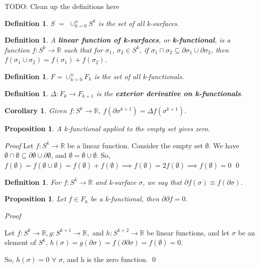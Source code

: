 \documentclass{book}
\newtheorem{defn}[equation]{Definition}
\newtheorem{coro}[equation]{Corollary}
\newtheorem{prop}[equation]{Proposition}
\renewenvironment{proof}{\emph{Proof}}{\qed}
\begin{document}
TODO: Clean up the definitions here

\begin{defn}
	S $=$ $\cup^n_{k=0}S^k$ is the set of all k-surfaces. 
\end{defn}

\begin{defn}
	A \textbf{linear function of k-surfaces}, or \textbf{k-functional}, is a function $f : S^k \to \mathbb{R}$ such that for $\sigma_1$, $\sigma_2 \in S^k$, if $\sigma_1 \cap \sigma_2 \subseteq \partial\sigma_1 \cup \partial\sigma_2$, then $f(\sigma_1\cup\sigma_2) = f(\sigma_1) + f(\sigma_2)$. 
\end{defn}

\begin{defn}
	$F = \cup_{k=0}^nF_k$ is the set of all k-functionals. 
\end{defn}

\begin{defn}
	$\Delta : F_k \to F_{k+1}$ is the \textbf{exterior derivative on k-functionals}. 
\end{defn}

\begin{coro}
	Given $f : S^k \to \mathbb{R}$, $f(\partial\sigma^{k+1}) = \Delta f(\sigma^{k+1})$. 
\end{coro}

\begin{prop}
	A k-functional applied to the empty set gives zero. 
\end{prop}
\begin{proof}
	Let $f : S^k \to \mathbb{R}$ be a linear function. Consider the empty set $\emptyset$. 
We have $\emptyset \cap \emptyset \subseteq \partial\emptyset \cup \partial\emptyset$, and $\emptyset = \emptyset\cup\emptyset$. 
So, $f(\emptyset) = f(\emptyset\cup\emptyset) = f(\emptyset) + f(\emptyset) \implies f(\emptyset) = 2f(\emptyset) \implies f(\emptyset) = 0$
\end{proof}


\begin{defn}
	For $f : S^k \to \mathbb{R}$ and k-surface $\sigma$, we say that $\partial f(\sigma) \equiv f(\partial\sigma)$. 
\end{defn}


\begin{prop}
	Let $f \in F_k$ be a k-functional, then $\partial\partial f = 0 $.
\end{prop}
\begin{proof}

	Let $f : S^k \to \mathbb{R}, g : S^{k+1} \to \mathbb{R},$ and $h : S^{k+2} \to \mathbb{R}$ be linear functions, and let $\sigma$ be an element of $S^k$. $h(\sigma) = g(\partial\sigma) = f(\partial\partial\sigma) = f(\emptyset) = 0$. 
	
	So, $h(\sigma) = 0$ $\forall$ $\sigma$, and h is the zero function. 
\end{proof}
\end{document}
